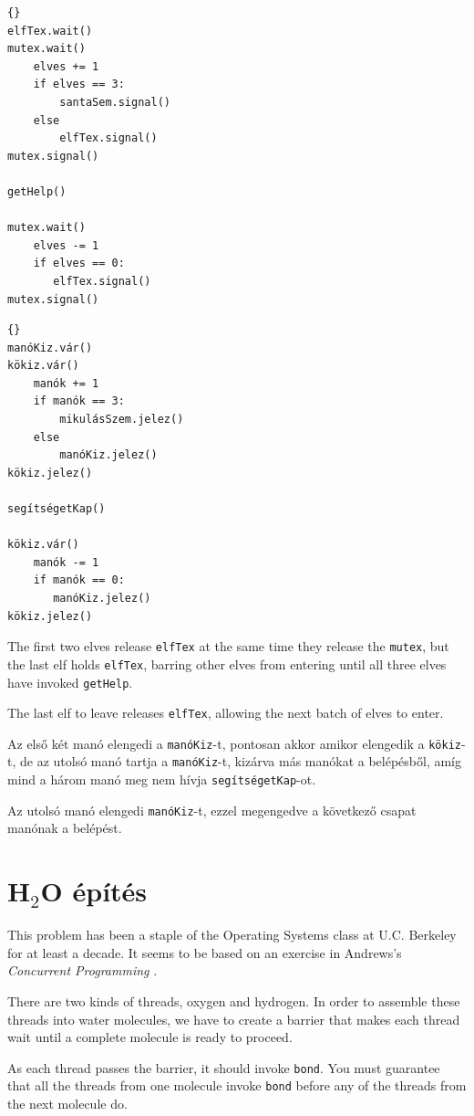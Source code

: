 \documentclass{book}
\begin{document}
\newpage
\begin{lstlisting}[title={Santa problem solution (elves)}]{}
elfTex.wait()
mutex.wait()
    elves += 1
    if elves == 3:
        santaSem.signal()
    else
        elfTex.signal()
mutex.signal()

getHelp()

mutex.wait()
    elves -= 1
    if elves == 0:
       elfTex.signal()
mutex.signal()
\end{lstlisting}

\begin{lstlisting}[title={Mikulás probléma megoldás (manók)}]{}
manóKiz.vár()
kökiz.vár()
    manók += 1
    if manók == 3:
        mikulásSzem.jelez()
    else
        manóKiz.jelez()
kökiz.jelez()

segítségetKap()

kökiz.vár()
    manók -= 1
    if manók == 0:
       manóKiz.jelez()
kökiz.jelez()
\end{lstlisting}

The first two elves release {\tt elfTex} at the same time they release
the {\tt mutex}, but the last elf holds {\tt elfTex}, barring other
elves from entering until all three elves have invoked {\tt getHelp}.

The last elf to leave releases {\tt elfTex}, allowing the
next batch of elves to enter.

Az első két manó elengedi a {\tt manóKiz}-t, pontosan akkor amikor elengedik
a {\tt kökiz}-t, de az utolsó manó tartja a {\tt manóKiz}-t, kizárva más
manókat a belépésből, amíg mind a három manó meg nem hívja {\tt segítségetKap}-ot.

Az utolsó manó elengedi {\tt manóKiz}-t, ezzel megengedve a következő
csapat manónak a belépést.

\newpage
\section{H$_2$O építés}
\label{water}

This problem has been a staple of the Operating Systems class
at U.C. Berkeley for at least a decade.  It seems to be based on
an exercise in Andrews's {\em Concurrent Programming} \cite{andrews}.

There are two kinds of threads, oxygen and hydrogen.  In order
to assemble these threads into water molecules, we have to
create a barrier that makes each thread wait until a
complete molecule is ready to proceed.

As each thread passes the barrier, it should invoke
{\tt bond}.  You must guarantee that all the threads
from one molecule invoke {\tt bond} before any of the threads
from the next molecule do.
\end{document}
